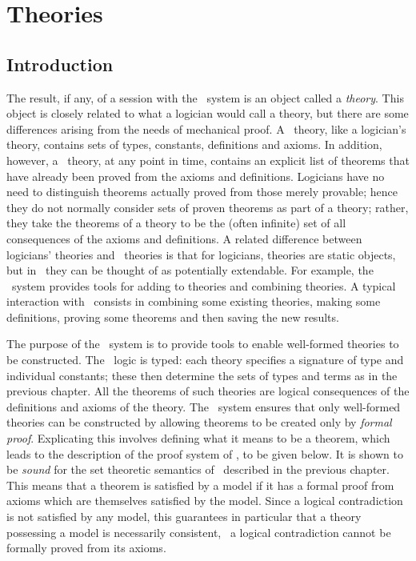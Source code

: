 \chapter{Theories}\label{semantics}

\section{Introduction}

The result, if any, of a session with the \HOL\ system is an object
called a {\it theory\/}.  This object is closely related to what a
logician would call a theory, but there are some differences arising
from the needs of mechanical proof.  A \HOL\ theory, like a logician's
theory, contains sets of types, constants, definitions and axioms.  In
addition, however, a \HOL\ theory, at any point in time, contains an
explicit list of theorems that have already been proved from the
axioms and definitions. Logicians have no need to distinguish theorems
actually proved from those merely provable; hence they do not normally
consider sets of proven theorems as part of a theory; rather, they
take the theorems of a theory to be the (often infinite) set of all
consequences of the axioms and definitions.  A related difference
between logicians' theories and \HOL\ theories is that for logicians,
theories are static objects, but in \HOL\ they can be thought of as
potentially extendable. For example, the \HOL\ system provides tools
for adding to theories and combining theories.  A typical interaction
with \HOL\ consists in combining some existing theories, making some
definitions, proving some theorems and then saving the new results.

The purpose of the \HOL\ system is to provide tools to enable
well-formed theories to be constructed.  The \HOL\ logic is typed:
each theory specifies a signature of type and individual constants;
these then determine the sets of types and terms as in the previous
chapter.  All the theorems of such theories are logical consequences
of the definitions and axioms of the theory.  The \HOL\ system ensures
that only well-formed theories can be constructed by allowing theorems
to be created only by {\it formal proof\/}. Explicating this involves
defining what it means to be a theorem, which leads to the description
of the proof system of \HOL, to be given below. It is shown to be {\em
sound\/} for the set theoretic semantics of \HOL\ described in the
previous chapter.  This means that a theorem is satisfied by a model
if it has a formal proof from axioms which are themselves satisfied by
the model. Since a logical contradiction is not satisfied by any
model, this guarantees in particular that a theory possessing a model
is necessarily consistent, \ie\ a logical contradiction cannot be
formally proved from its axioms.

